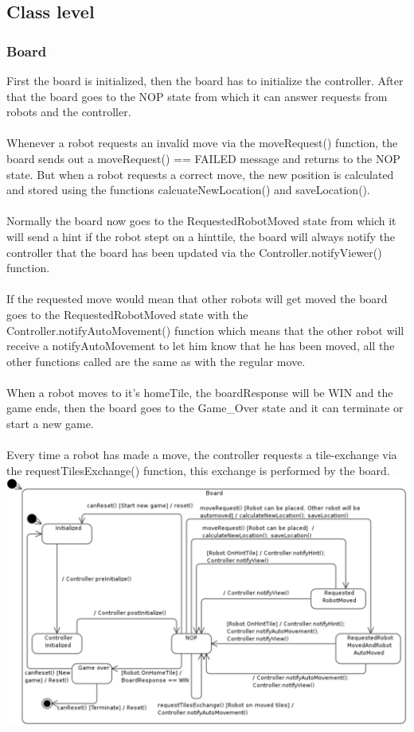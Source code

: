 \subsection{Class level}
	\subsubsection{Board}
	First the board is initialized, then the board has to initialize the controller. After that the board goes to the NOP state from which it can answer requests from robots and the controller. \\
\\
Whenever a robot requests an invalid move via the moveRequest() function, the board sends out a moveRequest() == FAILED message and returns to the NOP state. But when a robot requests a correct move, the new position is calculated and stored using the functions calcuateNewLocation() and saveLocation(). \\
\\
Normally the board now goes to the RequestedRobotMoved state from which it will send a hint if the robot stept on a hinttile, the board will always notify the controller that the board has been updated via the Controller.notifyViewer() function.\\
\\
If the requested move would mean that other robots will get moved the board goes to the RequestedRobotMoved state with the Controller.notifyAutoMovement() function which means that the other robot will receive a notifyAutoMovement to let him know that he has been moved, all the other functions called are the same as with the regular move.\\
\\
When a robot moves to it's homeTile, the boardResponse will be WIN and the game ends, then the board goes to the Game\_Over state and it can terminate or start a new game.\\
\\
Every time a robot has made a move, the controller requests a tile-exchange via the requestTilesExchange() function, this exchange is performed by the board.\\
	
	\includegraphics[width=\linewidth]{statecharts/board.pdf}

